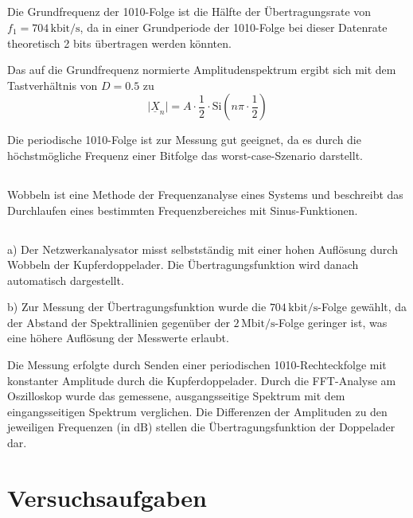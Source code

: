 \documentclass[a4paper, 12pt]{article}
\begin{document}
\subsection{}

Die Grundfrequenz der 1010-Folge ist die Hälfte der Übertragungsrate von $f_1 = 704 \,
\textrm{kbit/s}$, da in einer Grundperiode der 1010-Folge
bei dieser Datenrate theoretisch 2 bits übertragen werden könnten.



Das auf die Grundfrequenz normierte Amplitudenspektrum ergibt sich mit dem
Tastverhältnis von $D = 0.5$ zu
$$\mid \underline{X}_n \mid = A \cdot \frac{1}{2} \cdot \textrm{Si}(n \pi \cdot \frac{1}{2}) $$



Die periodische 1010-Folge ist zur Messung gut geeignet, da es durch die höchstmögliche Frequenz einer Bitfolge das worst-case-Szenario darstellt.

\subsection{}

Wobbeln ist eine Methode der Frequenzanalyse eines Systems und beschreibt das
Durchlaufen eines bestimmten Frequenzbereiches mit Sinus-Funktionen. 

\subsection{}

a) Der Netzwerkanalysator misst selbstständig mit einer hohen Auflösung durch
Wobbeln der Kupferdoppelader. Die Übertragungsfunktion wird danach automatisch dargestellt.

\noindent b) Zur Messung der Übertragungsfunktion wurde die $704 \,
\textrm{kbit}/\textrm{s}$-Folge gewählt, da der Abstand der Spektrallinien gegenüber der $2
\, \textrm{Mbit}/\textrm{s}$-Folge geringer ist, was eine höhere Auflösung der
Messwerte erlaubt.

Die Messung erfolgte durch Senden einer periodischen 1010-Rechteckfolge mit konstanter Amplitude
durch die Kupferdoppelader. Durch die FFT-Analyse am Oszilloskop wurde das
gemessene, ausgangsseitige Spektrum mit dem eingangsseitigen Spektrum
verglichen. Die Differenzen der Amplituden zu den jeweiligen Frequenzen (in
$\si{\deci\bel}$) stellen die Übertragungsfunktion der Doppelader dar.

\section{Versuchsaufgaben}
\end{document}
